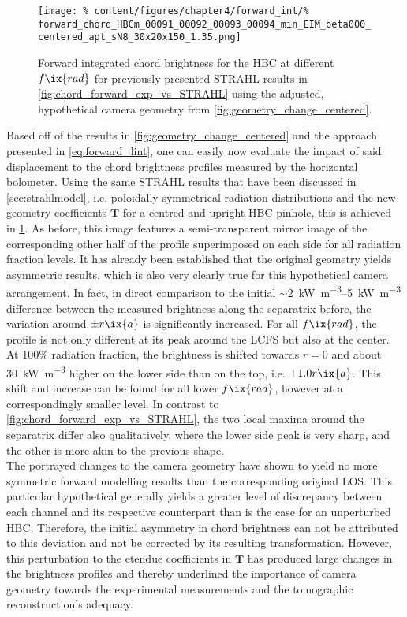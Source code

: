 %
            \begin{figure}[t]%
                \centering%
                \texttt{[image: \%
                    content/figures/chapter4/forward\_int/\%
                    forward\_chord\_HBCm\_00091\_00092\_00093\_00094\_min\_EIM\_beta000\_centered\_apt\_sN8\_30x20x150\_1.35.png]}%
                \caption{Forward integrated chord brightness for the HBC at different $f\ix{rad}$ for previously presented STRAHL results in \cref{fig:chord_forward_exp_vs_STRAHL} using the adjusted, hypothetical camera geometry from \cref{fig:geometry_change_centered}.}\label{fig:forward_intSTRAHL_centered}%
            \end{figure}%
%
            Based off of the results in \cref{fig:geometry_change_centered} and the approach presented in \cref{eq:forward_lint}, one can easily now evaluate the impact of said displacement to the chord brightness profiles measured by the horizontal bolometer. Using the same STRAHL results that have been discussed in \cref{sec:strahlmodel}, i.e. poloidally symmetrical radiation distributions and the new geometry coefficients $\mathbf{T}$ for a centred and upright HBC pinhole, this is achieved in \cref{fig:forward_intSTRAHL_centered}. As before, this image features a semi-transparent mirror image of the corresponding other half of the profile superimposed on each side for all radiation fraction levels. It has already been established that the original geometry yields asymmetric results, which is also very clearly true for this hypothetical camera arrangement. In fact, in direct comparison to the initial $\sim$\SIrange{2}{5}{\kilo\watt\per\cubic\meter} difference between the measured brightness along the separatrix before, the variation around $\pm r\ix{a}$ is significantly increased. For all $f\ix{rad}$, the profile is not only different at its peak around the LCFS but also at the center. At 100\% radiation fraction, the brightness is shifted towards $r=0$ and about \SI{30}{\kilo\watt\per\cubic\meter} higher on the lower side than on the top, i.e. $+1.0r\ix{a}$. This shift and increase can be found for all lower $f\ix{rad}$, however at a correspondingly smaller level. In contrast to \cref{fig:chord_forward_exp_vs_STRAHL}, the two local maxima around the separatrix differ also qualitatively, where the lower side peak is very sharp, and the other is more akin to the previous shape.\\%
            The portrayed changes to the camera geometry have shown to yield no more symmetric forward modelling results than the corresponding original LOS. This particular hypothetical generally yields a greater level of discrepancy between each channel and its respective counterpart than is the case for an unperturbed HBC. Therefore, the initial asymmetry in chord brightness can not be attributed to this deviation and not be corrected by its resulting transformation. However, this perturbation to the etendue coefficients in $\mathbf{T}$ has produced large changes in the brightness profiles and thereby underlined the importance of camera geometry towards the experimental measurements and the tomographic reconstruction's adequacy.%
%

